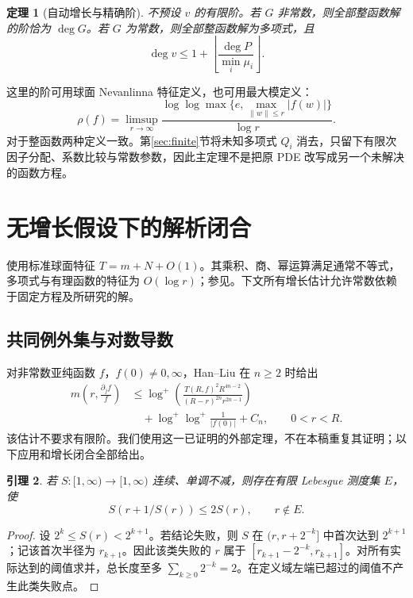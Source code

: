 \documentclass[UTF8,11pt,a4paper,fontset=fandol]{ctexart}
\newtheorem{theorem}{定理}[section]
\newtheorem{lemma}[theorem]{引理}
\theoremstyle{definition}\newtheorem{definition}[theorem]{定义}
\theoremstyle{remark}\newtheorem{remark}[theorem]{注}
\begin{document}
\begin{theorem}[自动增长与精确阶]\label{thm:growth}
不预设 $v$ 的有限阶。若 $G$ 非常数，则全部整函数解的阶恰为 $\deg G$。若 $G$ 为常数，则全部整函数解为多项式，且
\begin{equation}\label{eq:deg}
\deg v\le 1+\left\lfloor\frac{\deg P}{\min_i\mu_i}\right\rfloor.
\end{equation}
\end{theorem}
这里的阶可用球面 Nevanlinna 特征定义，也可用最大模定义：
\[
\rho(f)=\limsup_{r\to\infty}\frac{\log\log\max\{e,\max_{\|w\|\le r}|f(w)|\}}{\log r}.
\]
对于整函数两种定义一致。第\ref{sec:finite}节将未知多项式 $Q_i$ 消去，只留下有限次因子分配、系数比较与常数参数，因此主定理不是把原 PDE 改写成另一个未解决的函数方程。

\section{无增长假设下的解析闭合}\label{sec:analysis}
使用标准球面特征 $T=m+N+O(1)$。其乘积、商、幂运算满足通常不等式，多项式与有理函数的特征为 $O(\log r)$；参见\cite{Stoll1974}。下文所有增长估计允许常数依赖于固定方程及所研究的解。

\subsection{共同例外集与对数导数}
对非常数亚纯函数 $f$，$f(0)\ne0,\infty$，Han--Liu\cite[Theorem 1.1]{HanLiu2025} 在 $n\ge2$ 时给出
\begin{equation}\label{eq:HL}
\begin{split}
m\left(r,\frac{\partial_j f}{f}\right)
&\le \log^+\!\left(\frac{T(R,f)^2R^{4n-2}}{(R-r)^{2n}r^{2n-1}}\right)\\
&\quad+\log^+\log^+\frac1{|f(0)|}+C_n,\qquad 0<r<R.
\end{split}
\end{equation}
该估计不要求有限阶。我们使用这一已证明的外部定理，不在本稿重复其证明；以下应用和增长闭合全部给出。

\begin{lemma}\label{lem:radius}
若 $S:[1,\infty)\to[1,\infty)$ 连续、单调不减，则存在有限 Lebesgue 测度集 $E$，使
\[
S(r+1/S(r))\le2S(r),\qquad r\notin E.
\]
\end{lemma}
\begin{proof}
设 $2^k\le S(r)<2^{k+1}$。若结论失败，则 $S$ 在 $(r,r+2^{-k}]$ 中首次达到 $2^{k+1}$；记该首次半径为 $r_{k+1}$。因此该类失败的 $r$ 属于 $[r_{k+1}-2^{-k},r_{k+1}]$。对所有实际达到的阈值求并，总长度至多 $\sum_{k\ge0}2^{-k}=2$。在定义域左端已超过的阈值不产生此类失败点。
\end{proof}
\end{document}
